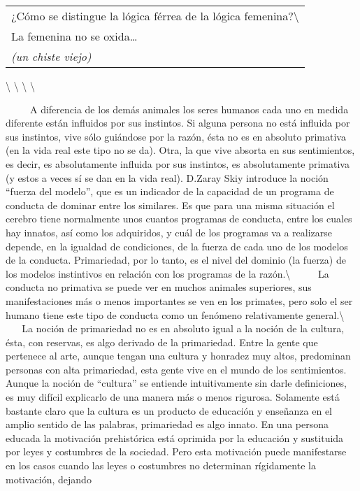 \begin{longtable}[]{@{}l@{}}
\toprule
¿Cómo se distingue la lógica férrea de la lógica
femenina?\textbackslash{}\tabularnewline
La femenina no se oxida\ldots{}\tabularnewline
\emph{(un chiste viejo)}\tabularnewline
\bottomrule
\end{longtable}

\textbackslash{} \textbackslash{} \textbackslash{} \textbackslash{}

~ ~ ~ A diferencia de los demás animales los seres humanos cada uno en
medida diferente están influidos por sus instintos. Si alguna persona no
está influida por sus instintos, vive sólo guiándose por la razón, ésta
no es en absoluto primativa (en la vida real este tipo no se da). Otra,
la que vive absorta en sus sentimientos, es decir, es absolutamente
influida por sus instintos, es absolutamente primativa (y estos a veces
sí se dan en la vida real). D.Zaray Skiy introduce la noción ``fuerza
del modelo'', que es un indicador de la capacidad de un programa de
conducta de dominar entre los similares. Es que para una misma situación
el cerebro tiene normalmente unos cuantos programas de conducta, entre
los cuales hay innatos, así como los adquiridos, y cuál de los programas
va a realizarse depende, en la igualdad de condiciones, de la fuerza de
cada uno de los modelos de la conducta. Primariedad, por lo tanto, es el
nivel del dominio (la fuerza) de los modelos instintivos en relación con
los programas de la razón.\textbackslash{} ~ ~ ~ La conducta no
primativa se puede ver en muchos animales superiores, sus
manifestaciones más o menos importantes se ven en los primates, pero
solo el ser humano tiene este tipo de conducta como un fenómeno
relativamente general.\textbackslash{} ~ ~ ~ La noción de primariedad no
es en absoluto igual a la noción de la cultura, ésta, con reservas, es
algo derivado de la primariedad. Entre la gente que pertenece al arte,
aunque tengan una cultura y honradez muy altos, predominan personas con
alta primariedad, esta gente vive en el mundo de los sentimientos.
Aunque la noción de ``cultura'' se entiende intuitivamente sin darle
definiciones, es muy difícil explicarlo de una manera más o menos
rigurosa. Solamente está bastante claro que la cultura es un producto de
educación y enseñanza en el amplio sentido de las palabras, primariedad
es algo innato. En una persona educada la motivación prehistórica está
oprimida por la educación y sustituida por leyes y costumbres de la
sociedad. Pero esta motivación puede manifestarse en los casos cuando
las leyes o costumbres no determinan rígidamente la motivación, dejando
